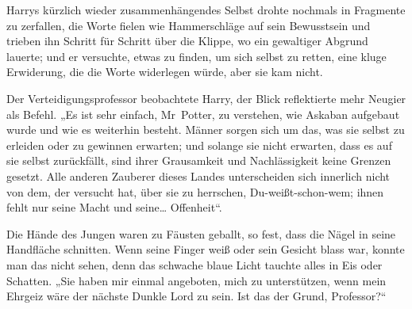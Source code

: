 Harrys kürzlich wieder zusammenhängendes Selbst drohte nochmals in Fragmente zu zerfallen, die Worte fielen wie Hammerschläge auf sein Bewusstsein und trieben ihn Schritt für Schritt über die Klippe, wo ein gewaltiger Abgrund lauerte; und er versuchte, etwas zu finden, um sich selbst zu retten, eine kluge Erwiderung, die die Worte widerlegen würde, aber sie kam nicht.

Der Verteidigungsprofessor beobachtete Harry, der Blick reflektierte mehr Neugier als Befehl. „Es ist sehr einfach, Mr~Potter, zu verstehen, wie Askaban aufgebaut wurde und wie es weiterhin besteht. Männer sorgen sich um das, was sie selbst zu erleiden oder zu gewinnen erwarten; und solange sie nicht erwarten, dass es auf sie selbst zurückfällt, sind ihrer Grausamkeit und Nachlässigkeit keine Grenzen gesetzt. Alle anderen Zauberer dieses Landes unterscheiden sich innerlich nicht von dem, der versucht hat, über sie zu herrschen, Du-weißt-schon-wem; ihnen fehlt nur seine Macht und seine… Offenheit“.

Die Hände des Jungen waren zu Fäusten geballt, so fest, dass die Nägel in seine Handfläche schnitten. Wenn seine Finger weiß oder sein Gesicht blass war, konnte man das nicht sehen, denn das schwache blaue Licht tauchte alles in Eis oder Schatten. „Sie haben mir einmal angeboten, mich zu unterstützen, wenn mein Ehrgeiz wäre der nächste Dunkle Lord zu sein. Ist das der Grund, Professor?“

